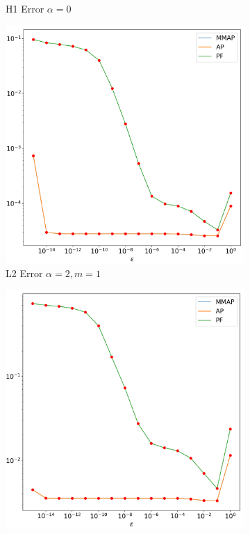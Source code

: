 \documentclass[12pt]{ociamthesis}
\begin{document}
\begin{figure}[H]
\begin{subfigure}{0.42\textwidth}
     \caption{H1 Error $\alpha=0$}
 \end{subfigure}
 \begin{subfigure}{0.42\textwidth}
     \includegraphics[width=\textwidth]{Pics/LHSims/E1b_MMAP_AP_PFL2.png}
     \caption{L2 Error $\alpha=2, m=1$} \label{E1_Mild_Ans}
 \end{subfigure}
 \begin{subfigure}{0.42\textwidth}
     \includegraphics[width=\textwidth]{Pics/LHSims/E1b_MMAP_AP_PFH1.png}

\end{subfigure}
\end{figure}
\end{document}
